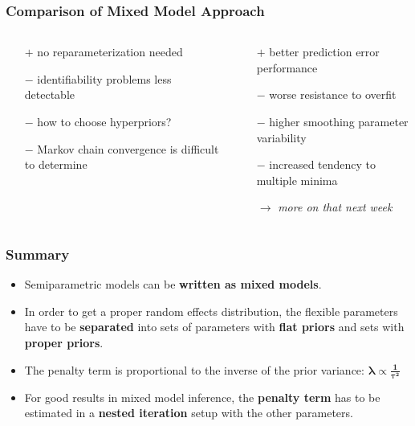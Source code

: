 \documentclass[final]{beamer}
\begin{document}
\begin{frame}
\frametitle{Comparison of Mixed Model Approach}
\begin{columns}[T]
\begin{column}{0.5\textwidth}
\centering{\textcolor{beamer@postercolour}{Fully Bayesian approach \\(MCMC)}}
\begin{itemize}
\item[$+$] no reparameterization needed
\item[$-$] identifiability problems less detectable
\item[$-$] how to choose hyperpriors?
\item[$-$] Markov chain convergence is difficult to determine
\end{itemize}
\end{column}
\begin{column}{0.5\textwidth}
\centering{\textcolor{beamer@postercolour}{Prediction error methods \\ (AIC, GCV)}}
\begin{itemize}
\item[$+$] better prediction error performance 
\item[$-$] worse resistance to overfit
\item[$-$] higher smoothing parameter variability
\item[$-$] increased tendency to multiple minima
\item[$\rightarrow$] \textit{more on that next week}
\end{itemize}
\end{column}
\end{columns}
\end{frame}







\begin{frame}
\frametitle{Summary}

\begin{itemize}
\item Semiparametric models can be \textbf{written as mixed models}.
\item In order to get a proper random effects distribution, the flexible parameters have to be \textbf{separated} into sets of parameters with \textbf{flat priors} and sets with \textbf{proper priors}.
\item The penalty term  is proportional to the inverse of the prior variance: $\mathbf{\boldsymbol{\lambda} \boldsymbol{\propto} \frac{1}{\boldsymbol{\tau}^2}}$
\item For good results in mixed model inference, the \textbf{penalty term} has to be estimated in a \textbf{nested iteration} setup with the other parameters.
\end{itemize}

\end{frame}
\end{document}
